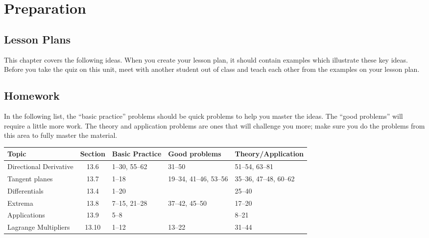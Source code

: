 \section{Preparation}

\subsection{Lesson Plans}

This chapter covers the following ideas. When you create your lesson plan, it should contain examples which illustrate these key ideas. Before you take the quiz on this unit, meet with another student out of class and teach each other from the examples on your lesson plan. 





\subsection{Homework}

In the following list, the ``basic practice'' problems should be quick
problems to help you master the ideas.  The ``good problems'' will
require a little more work.  The theory and application problems are
ones that will challenge you more; make sure you do the problems from
this area to fully master the material.  

\begin{center}
  \begin{tabular}{lcp{1.3in}p{1.3in}p{1.3in}}\toprule
    Topic & Section & Basic Practice & Good problems & Theory/Application \\\midrule
    Directional Derivative & 13.6 & 1--30, 55--62 & 31--50 & 51--54, 63--81\\
    Tangent planes & 13.7 & 1--18& 19--34, 41--46, 53--56 & 35--36, 47--48, 60--62\\
    Differentials & 13.4 & 1--20 & & 25--40\\
    Extrema & 13.8 & 7--15, 21--28 & 37--42, 45--50 & 17--20\\
    Applications & 13.9 & 5--8 & & 8--21\\
    Lagrange Multipliers & 13.10 & 1--12 & 13--22 & 31--44
  \end{tabular}
\end{center}


